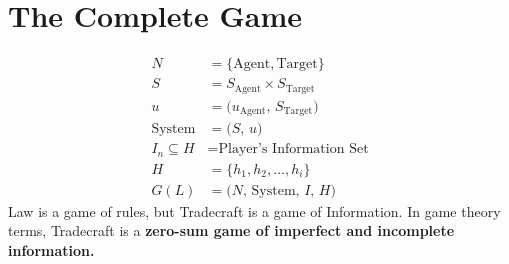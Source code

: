 \documentclass{article}
\begin{document}
\section{The Complete Game}
\begin{align*}
  N &= \{\text{Agent}, \text{Target}\} \\
  S &= S_{\text{Agent}} \times S_{\text{Target}} \\
  u &= \big(u_{\text{Agent}},\, S_{\text{Target}}\big) \\
  \text{System} &= \big(S,\, u\big) \\
  I_{n}\subseteq H &= \text{Player's Information Set} \\
  H &= \{h_1, h_2, \dots, h_i\} \\
  G(L) &= \big(N,\, \text{System},\, I,\, H\big)
\end{align*}
Law is a game of rules, but Tradecraft is a game of Information. In game theory terms, Tradecraft is a \textbf{zero-sum game of imperfect and incomplete information.}
\end{document}
